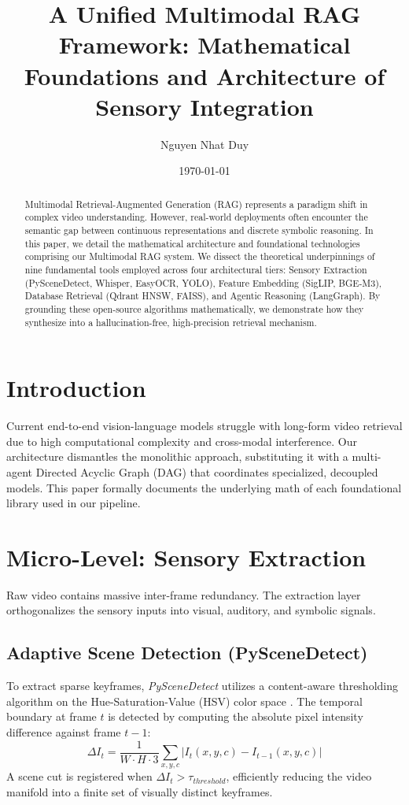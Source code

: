 \documentclass[11pt,a4paper]{article}
\title{\textbf{A Unified Multimodal RAG Framework: Mathematical Foundations and Architecture of Sensory Integration}}
\author[1]{Nguyen Nhat Duy}
\affil[1]{Multimodal RAG Project}
\date{\today}
\begin{document}
\maketitle

\begin{abstract}
Multimodal Retrieval-Augmented Generation (RAG) represents a paradigm shift in complex video understanding. However, real-world deployments often encounter the semantic gap between continuous representations and discrete symbolic reasoning. In this paper, we detail the mathematical architecture and foundational technologies comprising our Multimodal RAG system. We dissect the theoretical underpinnings of nine fundamental tools employed across four architectural tiers: Sensory Extraction (PySceneDetect, Whisper, EasyOCR, YOLO), Feature Embedding (SigLIP, BGE-M3), Database Retrieval (Qdrant HNSW, FAISS), and Agentic Reasoning (LangGraph). By grounding these open-source algorithms mathematically, we demonstrate how they synthesize into a hallucination-free, high-precision retrieval mechanism.
\end{abstract}

\section{Introduction}
Current end-to-end vision-language models struggle with long-form video retrieval due to high computational complexity and cross-modal interference. Our architecture dismantles the monolithic approach, substituting it with a multi-agent Directed Acyclic Graph (DAG) that coordinates specialized, decoupled models. This paper formally documents the underlying math of each foundational library used in our pipeline.

\section{Micro-Level: Sensory Extraction}
Raw video contains massive inter-frame redundancy. The extraction layer orthogonalizes the sensory inputs into visual, auditory, and symbolic signals.

\subsection{Adaptive Scene Detection (PySceneDetect)}
To extract sparse keyframes, \textit{PySceneDetect} utilizes a content-aware thresholding algorithm on the Hue-Saturation-Value (HSV) color space \cite{scenedetect}. The temporal boundary at frame $t$ is detected by computing the absolute pixel intensity difference against frame $t-1$:
\begin{equation}
\Delta I_t = \frac{1}{W \cdot H \cdot 3} \sum_{x, y, c} \Big| I_t(x,y,c) - I_{t-1}(x,y,c) \Big|
\end{equation}
A scene cut is registered when $\Delta I_t > \tau_{threshold}$, efficiently reducing the video manifold into a finite set of visually distinct keyframes.
\end{document}
